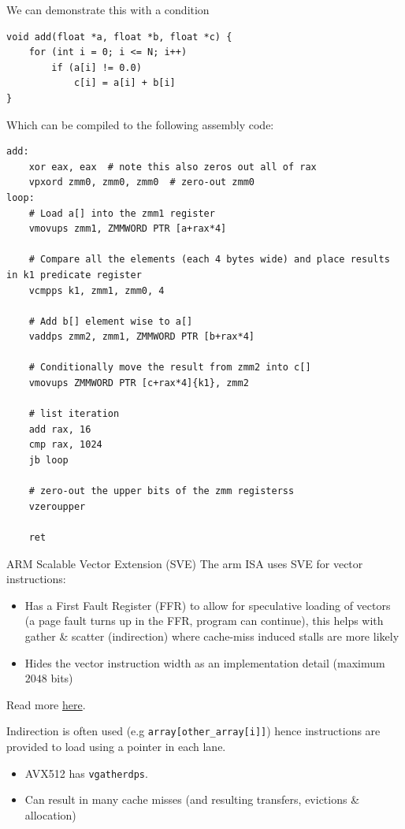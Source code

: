 We can demonstrate this with a condition
\begin{verbatim}
void add(float *a, float *b, float *c) {
    for (int i = 0; i <= N; i++)
        if (a[i] != 0.0)
            c[i] = a[i] + b[i]
}
\end{verbatim}
Which can be compiled to the following assembly code:
\begin{verbatim}
add:
    xor eax, eax  # note this also zeros out all of rax
    vpxord zmm0, zmm0, zmm0  # zero-out zmm0
loop:
    # Load a[] into the zmm1 register
    vmovups zmm1, ZMMWORD PTR [a+rax*4]

    # Compare all the elements (each 4 bytes wide) and place results in k1 predicate register
    vcmpps k1, zmm1, zmm0, 4  

    # Add b[] element wise to a[]
    vaddps zmm2, zmm1, ZMMWORD PTR [b+rax*4]

    # Conditionally move the result from zmm2 into c[]
    vmovups ZMMWORD PTR [c+rax*4]{k1}, zmm2 

    # list iteration
    add rax, 16
    cmp rax, 1024
    jb loop

    # zero-out the upper bits of the zmm registerss
    vzeroupper 

    ret
\end{verbatim}
\begin{sidenotebox}{ARM Scalable Vector Extension (SVE)}
    The arm ISA uses SVE for vector instructions:
    \begin{itemize}
        \item Has a First Fault Register (FFR) to allow for speculative loading of vectors (a page fault turns up in the FFR, program can continue), this helps with gather \& scatter (indirection) where cache-miss induced stalls are more likely
        \item Hides the vector instruction width as an implementation detail (maximum $2048$ bits)
    \end{itemize}
    Read more \href{https://developer.arm.com/documentation/102476/0100}{here}.
\end{sidenotebox}


Indirection is often used (e.g \texttt{array[other_array[i]]}) hence instructions are provided to load using a pointer in each lane.
\begin{itemize}
    \item AVX512  has \texttt{vgatherdps}.
    \item Can result in many cache misses (and resulting transfers, evictions \& allocation)
\end{itemize}

